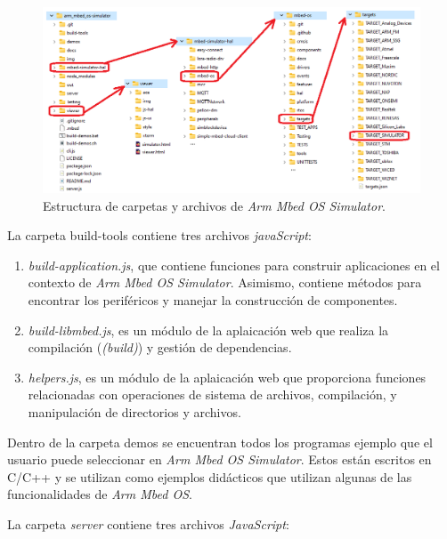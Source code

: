 \begin{figure}[ht]
	\centering
	\includegraphics[scale=.50]{./Figures/carpetasYArchivosMbedOS.png}
	\caption{Estructura de carpetas y archivos de \textit{Arm Mbed OS Simulator}.}
	\label{fig:estructuraMbed1}
\end{figure}

\newpage

La carpeta \textquotedbl build-tools\textquotedbl{} contiene tres archivos \textit{javaScript}: 

\begin{enumerate}
    \item \textit{build-application.js}, que contiene funciones para construir aplicaciones en el contexto de \textit{Arm Mbed OS Simulator}. Asimismo, contiene métodos para encontrar los periféricos y manejar la construcción de componentes.
	
    \item \textit{build-libmbed.js}, es un módulo de la aplaicación web que realiza la compilación (\textit{(build)}) y gestión de dependencias.

    \item \textit{helpers.js}, es un módulo de la aplaicación web que proporciona funciones relacionadas con operaciones de sistema de archivos, compilación, y manipulación de directorios y archivos.
\end{enumerate}
 
Dentro de la carpeta \textquotedbl demos\textquotedbl{} se encuentran todos los programas ejemplo que el usuario puede seleccionar en \textit{Arm Mbed OS Simulator}. Estos están escritos en C/C++ y se utilizan como ejemplos didácticos que utilizan algunas de las funcionalidades de \textit{Arm Mbed OS}.
 
La carpeta \textquotedbl \textit{server}\textquotedbl{} contiene tres archivos \textit{JavaScript}: 

